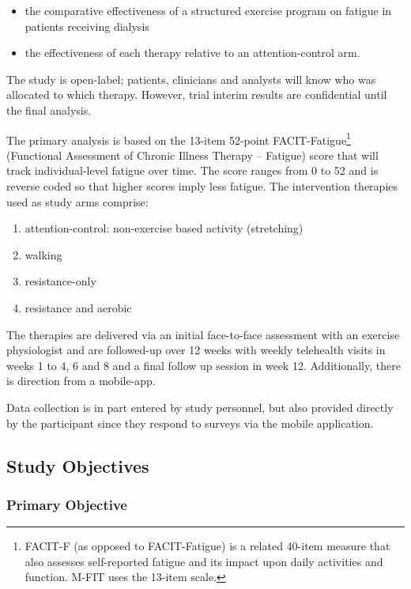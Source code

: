 \documentclass[11pt,parskip=half-]{scrartcl}
\providecommand{\tightlist}{%
  \setlength{\itemsep}{0pt}\setlength{\parskip}{0pt}}
\begin{document}
\begin{itemize}\tightlist
  \item the comparative effectiveness of a structured exercise program on fatigue in patients receiving dialysis
  \item the effectiveness of each therapy relative to an attention-control arm.
\end{itemize}

The study is open-label; patients, clinicians and analysts will know who was allocated to which therapy. However, trial interim results are confidential until the final analysis.

The primary analysis is based on the 13-item 52-point FACIT-Fatigue\footnote{FACIT-F (as opposed to FACIT-Fatigue) is a related 40-item measure that also assesses self-reported fatigue and its impact upon daily activities and function. M-FIT uses the 13-item scale.} (Functional Assessment of Chronic Illness Therapy – Fatigue) score that will track individual-level fatigue over time. The score ranges from 0 to 52 and is reverse coded so that higher scores imply less fatigue. The intervention therapies used as study arms comprise:

\begin{enumerate}\tightlist
  \item attention-control: non-exercise based activity (stretching)
  \item walking
  \item resistance-only
  \item resistance and aerobic
\end{enumerate}

The therapies are delivered via an initial face-to-face assessment with an exercise physiologist and are followed-up over 12 weeks with weekly telehealth visits in weeks 1 to 4, 6 and 8 and a final follow up session in week 12. Additionally, there is direction from a mobile-app.

Data collection is in part entered by study personnel, but also provided directly by the participant since they respond to surveys via the mobile application.

\clearpage

\subsection{Study Objectives}
\label{objectives}


\subsubsection{Primary Objective}
\label{primary-objective}
\end{document}
